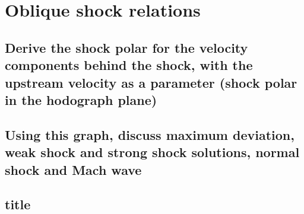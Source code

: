 \documentclass[british,french,11pt, a4paper, openany]{article}
\begin{document}
\section{Oblique shock relations}
\subsection{Derive the shock polar for the velocity components behind the shock, with the upstream velocity as a parameter (shock polar in the hodograph plane)}
\subsection{Using this graph, discuss maximum deviation, weak shock and strong shock solutions, normal shock and Mach wave}
\subsection{title}
\end{document}
